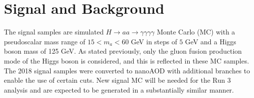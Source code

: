 \documentclass[12pt]{article}
\begin{document}

\section{Signal and Background}
The signal samples are simulated $H \rightarrow aa \rightarrow \gamma\gamma\gamma\gamma$ Monte Carlo (MC) with a pseudoscalar mass range of $15 < m_a < 60$ GeV in steps of $5$ GeV and a Higgs boson mass of 125 GeV. As stated previously, only the gluon fusion production mode of the Higgs boson is considered, and this is reflected in these MC samples. The 2018 signal samples were converted to nanoAOD with additional branches to enable the use of certain cuts. New signal MC will be needed for the Run 3 analysis and are expected to be generated in a substantially similar manner.\par
\end{document}
